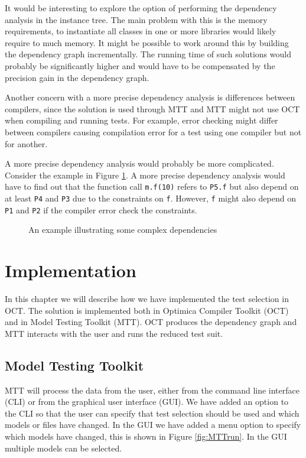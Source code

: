 \documentclass{cslthse-msc}
\begin{document}
It would be interesting to explore the option of performing the dependency analysis in the instance tree. The main problem with this is the memory requirements, to instantiate all classes in one or more libraries would likely require to much memory. It might be possible to work around this by building the dependency graph incrementally. The running time of such solutions would probably be significantly higher and would have to be compensated by the precision gain in the dependency graph. 

Another concern with a more precise dependency analysis is differences between compilers, since the solution is used through MTT and MTT might not use OCT when compiling and running tests. For example, error checking might differ between compilers causing compilation error for a test using one compiler but not for another.

A more precise dependency analysis would probably be more complicated. Consider the example in Figure \ref{fig:constrainedBy}. A more precise dependency analysis would have to find out that the function call \texttt{m.f(10)} refers to \texttt{P5.f} but also depend on at least \texttt{P4} and \texttt{P3} due to the constraints on \texttt{f}. However, \texttt{f} might also depend on \texttt{P1} and \texttt{P2} if the compiler error check the constraints. 

\begin{figure}[htbp]
    \centering
    \raisebox{4.0 cm}{}
    \caption{An example illustrating some complex dependencies}
    \label{fig:constrainedBy}
\end{figure}


\chapter[Implementation]{Implementation}
In this chapter we will describe how we have implemented the test selection in OCT. The solution is implemented both in Optimica Compiler Toolkit (OCT) and in Model Testing Toolkit (MTT). OCT produces the dependency graph and MTT interacts with the user and runs the reduced test suit.

\section{Model Testing Toolkit}

MTT will process the data from the user, either from the command line interface (CLI) or from the graphical user interface (GUI). We have added an option to the CLI so that the user can specify that test selection should be used and which models or files have changed. In the GUI we have added a menu option to specify which models have changed, this is shown in Figure \ref{fig:MTTrun}. In the GUI multiple models can be selected.
\end{document}

